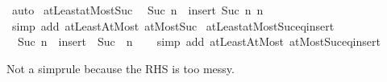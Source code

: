 \begin{isabellebody}
%
\isadelimproof
%
\endisadelimproof
%
\isatagproof
{}\isamarkupfalse%
\ auto%
\endisatagproof
{\isafoldproof}%
%
\isadelimproof
\isanewline
%
\endisadelimproof
\isanewline
{}\isamarkupfalse%
\ atLeast{}{\isacharunderscore}{\kern0pt}atMost{\isacharunderscore}{\kern0pt}Suc{\isacharcolon}{\kern0pt}\isanewline
\ \ {\isachardoublequoteopen}{\isacharbraceleft}{\kern0pt}{}{\isachardot}{\kern0pt}{\isachardot}{\kern0pt}Suc\ n{\isacharbraceright}{\kern0pt}\ {\isacharequal}{\kern0pt}\ insert\ {\isacharparenleft}{\kern0pt}Suc\ n{\isacharparenright}{\kern0pt}\ {\isacharbraceleft}{\kern0pt}{}{\isachardot}{\kern0pt}{\isachardot}{\kern0pt}n{\isacharbraceright}{\kern0pt}{\isachardoublequoteclose}\isanewline
%
\isadelimproof
\ \ %
\endisadelimproof
%
\isatagproof
{}\isamarkupfalse%
\ {\isacharparenleft}{\kern0pt}simp\ add{\isacharcolon}{\kern0pt}\ atLeast{}AtMost\ atMost{\isacharunderscore}{\kern0pt}Suc{\isacharparenright}{\kern0pt}%
\endisatagproof
{\isafoldproof}%
%
\isadelimproof
\isanewline
%
\endisadelimproof
\isanewline
{}\isamarkupfalse%
\ atLeast{}{\isacharunderscore}{\kern0pt}atMost{\isacharunderscore}{\kern0pt}Suc{\isacharunderscore}{\kern0pt}eq{\isacharunderscore}{\kern0pt}insert{\isacharunderscore}{\kern0pt}{}{\isacharcolon}{\kern0pt}\isanewline
\ \ {\isachardoublequoteopen}{\isacharbraceleft}{\kern0pt}{}{\isachardot}{\kern0pt}{\isachardot}{\kern0pt}Suc\ n{\isacharbraceright}{\kern0pt}\ {\isacharequal}{\kern0pt}\ insert\ {}\ {\isacharparenleft}{\kern0pt}Suc\ {\isacharbackquote}{\kern0pt}\ {\isacharbraceleft}{\kern0pt}{}{\isachardot}{\kern0pt}{\isachardot}{\kern0pt}n{\isacharbraceright}{\kern0pt}{\isacharparenright}{\kern0pt}{\isachardoublequoteclose}\isanewline
%
\isadelimproof
\ \ %
\endisadelimproof
%
\isatagproof
{}\isamarkupfalse%
\ {\isacharparenleft}{\kern0pt}simp\ add{\isacharcolon}{\kern0pt}\ atLeast{}AtMost\ atMost{\isacharunderscore}{\kern0pt}Suc{\isacharunderscore}{\kern0pt}eq{\isacharunderscore}{\kern0pt}insert{\isacharunderscore}{\kern0pt}{}{\isacharparenright}{\kern0pt}%
\endisatagproof
{\isafoldproof}%
%
\isadelimproof
%
\endisadelimproof
%
\isadelimdocument
%
\endisadelimdocument
%
\isatagdocument
%
\isamarkuptrue%
%
\endisatagdocument
{\isafolddocument}%
%
\isadelimdocument
%
\endisadelimdocument
%
\begin{isamarkuptext}%
Not a simprule because the RHS is too messy.%

\end{isamarkuptext}
\end{isabellebody}
